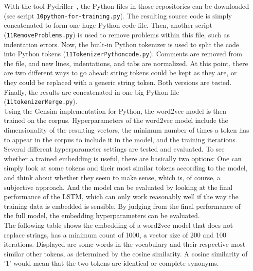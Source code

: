 \documentclass[
a4paper,
pagesize,
pdftex,
12pt,
twoside, %
BCOR=5mm, %
ngerman,
fleqn,
final,
]{scrartcl}
\begin{document}
	\normalsize
	With the tool Pydriller~\cite{Spadini.2018}, the Python files in those repositories can be downloaded (see script \texttt{10python-for-training.py}). The resulting source code is simply concatenated to form one huge Python code file. Then, another script (\texttt{11RemoveProblems.py}) is used to remove problems within this file, such as indentation errors. Now, the built-in Python tokenizer is used to split the code into Python tokens (\texttt{11TokenizerPythoncode.py}). Comments are removed from the file, and new lines, indentations, and tabs are normalized. At this point, there are two different ways to go ahead: string tokens could be kept as they are, or they could be replaced with a generic string token. Both versions are tested. Finally, the results are concatenated in one big Python file (\texttt{11tokenizerMerge.py}).\\
	Using the Gensim implementation for Python, the word2vec model is then trained on the corpus. Hyperparameters of the word2vec model include the dimensionality of the resulting vectors, the minimum number of times a token has to appear in the corpus to include it in the model, and the training iterations. Several different hyperparameter settings are tested and evaluated. To see whether a trained embedding is useful, there are basically two options: One can simply look at some tokens and their most similar tokens according to the model, and think about whether they seem to make sense, which is, of course, a subjective approach. And the model can be evaluated by looking at the final performance of the LSTM, which can only work reasonably well if the way the training data is embedded is sensible. By judging from the final performance of the full model, the embedding hyperparameters can be evaluated.\\
	The following table shows the embedding of a word2vec model that does not replace strings, has a minimum count of 1000, a vector size of 200 and 100 iterations. Displayed are some words in the vocabulary and their respective most similar other tokens, as determined by the cosine similarity. A cosine similarity of '1' would mean that the two tokens are identical or complete synonyms.
	
\end{document}
